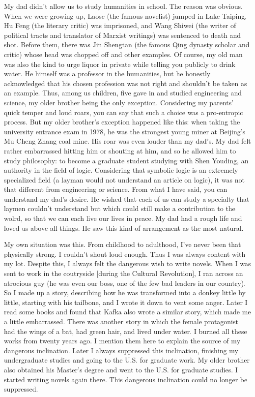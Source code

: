 My dad didn't allow us to study humanities in school. The reason was obvious. When we were growing up, Laose (the famous novelist) jumped in Lake Taiping, Hu Feng (the literary critic) was imprisoned, and Wang Shiwei (the writer of political tracts and translator of Marxist writings) was sentenced to death and shot. Before them, there was Jin Shengtan (the famous Qing dynasty scholar and critic) whose head was chopped off and other examples. Of course, my old man was also the kind to urge liquor in private while telling you publicly to drink water. He himself was a professor in the humanities, but he honestly acknowledged that his chosen profession was not right and shouldn't be taken as an example. Thus, among us children, five gave in and studied engineering and science, my older brother being the only exception. Considering my parents' quick temper and loud roars, you can say that such a choice was a pro-entropic process. But my older brother's exception happened like this: when taking the university entrance exam in 1978, he was the strongest young miner at Beijing's Mu Cheng Zhang coal mine. His roar was even louder than my dad's. My dad felt rather embarrassed hitting him or shouting at him, and so he allowed him to study philosophy: to become a graduate student studying with Shen Youding, an authority in the field of logic. Considering that symbolic logic is an extremely specialized field (a layman would not understand an article on logic), it was not that different from engineering or science. From what I have said, you can understand my dad's desire. He wished that each of us can study a specialty that laymen couldn't understand but which could still make a contribution to the wolrd, so that we can each live our lives in peace. My dad had a rough life and loved us above all things. He saw this kind of arrangement as the most natural. 

My own situation was this. From childhood to adulthood, I've never been that physically strong. I couldn't shout loud enough. Thus I was always content with my lot. Despite this, I always felt the dangerous wish to write novels. When I was sent to work in the coutryside [during the Cultural Revolution], I ran across an atrocious guy (he was even our boss, one of the few bad leaders in our country). So I made up a story, describing how he was transformed into a donkey little by little, starting with his tailbone, and I wrote it down to vent some anger. Later I read some books and found that Kafka also wrote a similar story, which made me a little embarrassed. There was another story in which the female protagonist had the wings of a bat, had green hair, and lived under water. I burned all these works from twenty years ago. I mention them here to explain the source of my dangerous inclination. Later I always suppressed this inclination, finishing my undergraduate studies and going to the U.S. for graduate work. My older brother also obtained his Master's degree and went to the U.S. for graduate studies. I started writing novels again there. This dangerous inclination could no longer be suppressed. 

